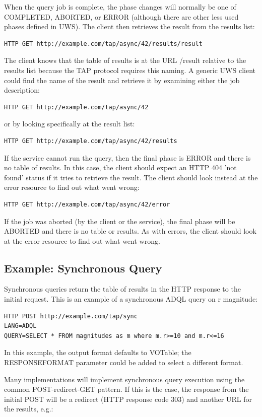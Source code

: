 \documentclass[11pt,letter]{ivoa}
\begin{document}
When the query job is complete, the phase changes will normally be one of 
COMPLETED, ABORTED, or ERROR (although there are other less used phases defined 
in UWS). The client then retrieves the result from the results list:
\begin{verbatim}
HTTP GET http://example.com/tap/async/42/results/result
\end{verbatim}
The client knows that the table of results is at the URL /result relative to the 
results list because the TAP protocol requires this naming. A generic UWS client 
could find the name of the result and retrieve it by examining either the job 
description:
\begin{verbatim}
HTTP GET http://example.com/tap/async/42
\end{verbatim}
or by looking specifically at the result list:
\begin{verbatim}
HTTP GET http://example.com/tap/async/42/results
\end{verbatim}
If the service cannot run the query, then the final phase is ERROR and there is 
no table of results. In this case, the client should expect an HTTP 404 'not 
found' status if it tries to retrieve the result. The client should look instead 
at the error resource to find out what went wrong:
\begin{verbatim}
HTTP GET http://example.com/tap/async/42/error
\end{verbatim}
If the job was aborted (by the client or the service), the final phase will be 
ABORTED and there is no table or results. As with errors, the client should look 
at the error resource to find out what went wrong.

\subsection{Example: Synchronous Query}

Synchronous queries return the table of results in the HTTP response to the 
initial request. This is an example of a synchronous ADQL query on r magnitude:

\begin{verbatim}
HTTP POST http://example.com/tap/sync
LANG=ADQL
QUERY=SELECT * FROM magnitudes as m where m.r>=10 and m.r<=16
\end{verbatim}

In this example, the output format defaults to VOTable; 
the RESPONSEFORMAT parameter could be added to select a different format.

Many implementations will implement synchronous query execution using the 
common POST-redirect-GET pattern. If this is the case, the response from the 
initial POST will be a redirect (HTTP response code 303) and another URL for the 
results, e.g.: 
\end{document}
